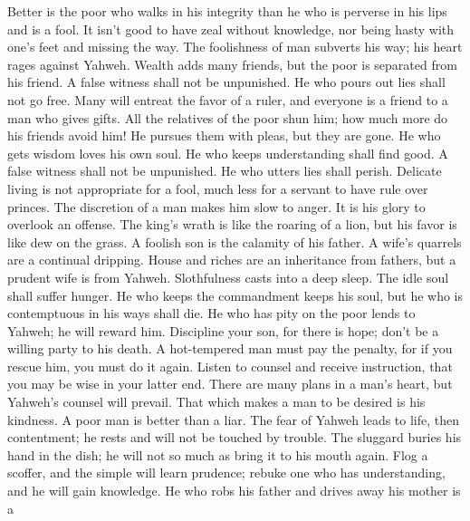  Better is the poor who walks in his integrity than he who
is perverse in his lips and is a fool.  It isn't good to
have zeal without knowledge, nor being hasty with one's feet and missing
the way.  The foolishness of man subverts his way; his
heart rages against Yahweh.  Wealth adds many friends, but
the poor is separated from his friend.  A false witness
shall not be unpunished. He who pours out lies shall not go free.
 Many will entreat the favor of a ruler, and everyone is a
friend to a man who gives gifts.  All the relatives of the
poor shun him; how much more do his friends avoid him! He pursues them
with pleas, but they are gone.  He who gets wisdom loves
his own soul. He who keeps understanding shall find good. 
A false witness shall not be unpunished. He who utters lies shall
perish.  Delicate living is not appropriate for a fool,
much less for a servant to have rule over princes.  The
discretion of a man makes him slow to anger. It is his glory to overlook
an offense.  The king's wrath is like the roaring of a
lion, but his favor is like dew on the grass.  A foolish
son is the calamity of his father. A wife's quarrels are a continual
dripping.  House and riches are an inheritance from
fathers, but a prudent wife is from Yahweh.  Slothfulness
casts into a deep sleep. The idle soul shall suffer hunger.
 He who keeps the commandment keeps his soul, but he who
is contemptuous in his ways shall die.  He who has pity
on the poor lends to Yahweh; he will reward him. 
Discipline your son, for there is hope; don't be a willing party to his
death.  A hot-tempered man must pay the penalty, for if
you rescue him, you must do it again.  Listen to counsel
and receive instruction, that you may be wise in your latter end.
 There are many plans in a man's heart, but Yahweh's
counsel will prevail.  That which makes a man to be
desired is his kindness. A poor man is better than a liar.
 The fear of Yahweh leads to life, then contentment; he
rests and will not be touched by trouble.  The sluggard
buries his hand in the dish; he will not so much as bring it to his
mouth again.  Flog a scoffer, and the simple will learn
prudence; rebuke one who has understanding, and he will gain knowledge.
 He who robs his father and drives away his mother is a
